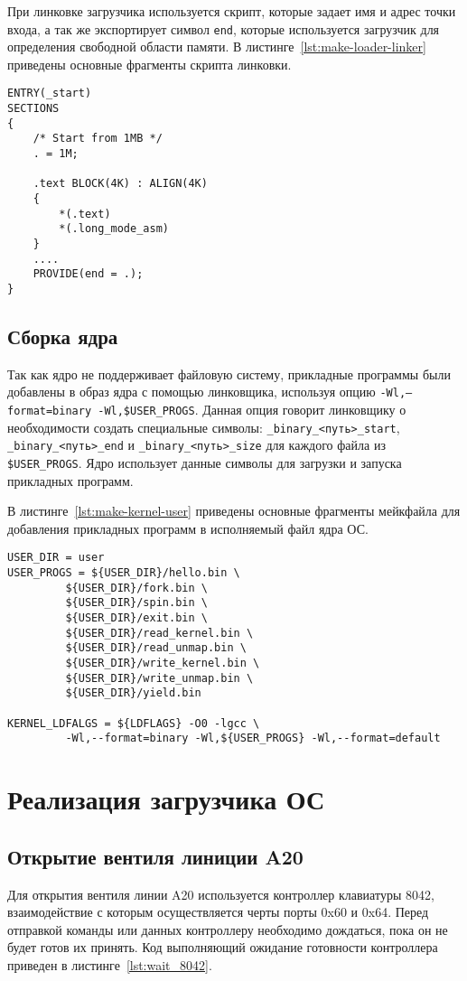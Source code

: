При линковке загрузчика используется скрипт, которые задает имя и адрес точки входа, а так
же экспортирует символ \texttt{end}, которые используется загрузчик для определения свободной
области памяти. В листинге~\ref{lst:make-loader-linker} приведены основные фрагменты скрипта линковки.

\begin{lstlisting}[language=Make, caption={Фрагменты скрипта линковки}, label={lst:make-loader-linker}]
ENTRY(_start)
SECTIONS
{
	/* Start from 1MB */
	. = 1M;

	.text BLOCK(4K) : ALIGN(4K)
	{
		*(.text)
		*(.long_mode_asm)
	}
	....
	PROVIDE(end = .);
}
\end{lstlisting}


\subsection{Сборка ядра}
Так как ядро не поддерживает файловую систему, прикладные программы были добавлены в образ ядра
с помощью линковщика, используя опцию \texttt{-Wl,--format=binary -Wl,\${USER\_PROGS}}. Данная
опция говорит линковщику о необходимости создать специальные символы: \texttt{\_binary\_<путь>\_start},
\texttt{\_binary\_<путь>\_end} и \texttt{\_binary\_<путь>\_size} для каждого файла из \texttt{\${USER\_PROGS}}.
Ядро использует данные символы для загрузки и запуска прикладных программ.

В листинге~\ref{lst:make-kernel-user} приведены основные фрагменты мейкфайла для добавления
прикладных программ в исполняемый файл ядра ОС.

\begin{lstlisting}[language=Make, caption={Фрагмент мейкфайла для добавления бинарных файлов}, label={lst:make-kernel-user}]
USER_DIR = user
USER_PROGS = ${USER_DIR}/hello.bin \
	     ${USER_DIR}/fork.bin \
	     ${USER_DIR}/spin.bin \
	     ${USER_DIR}/exit.bin \
	     ${USER_DIR}/read_kernel.bin \
	     ${USER_DIR}/read_unmap.bin \
	     ${USER_DIR}/write_kernel.bin \
	     ${USER_DIR}/write_unmap.bin \
	     ${USER_DIR}/yield.bin

KERNEL_LDFALGS = ${LDFLAGS} -O0 -lgcc \
		 -Wl,--format=binary -Wl,${USER_PROGS} -Wl,--format=default
\end{lstlisting}

\section{Реализация загрузчика ОС}
\subsection{Открытие вентиля линиции A20}
Для открытия вентиля линии A20 используется контроллер клавиатуры 8042, взаимодействие с которым
осуществляется черты порты 0x60 и 0x64. Перед отправкой команды или данных контроллеру необходимо дождаться, пока
он не будет готов их принять. Код выполняющий ожидание готовности контроллера приведен в листинге~\ref{lst:wait_8042}.

